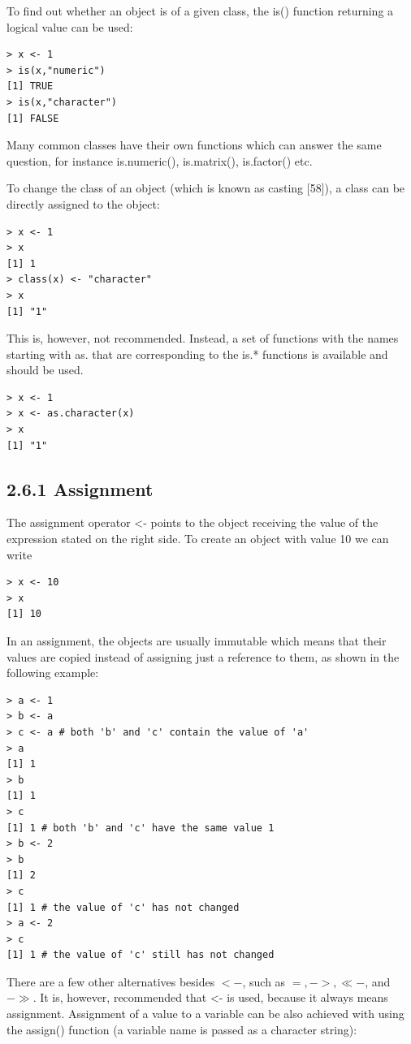 \documentclass[10pt]{book}
\begin{document}
To find out whether an object is of a given class, the is() function returning a logical value can be used:

\begin{verbatim}
> x <- 1
> is(x,"numeric")
[1] TRUE
> is(x,"character")
[1] FALSE
\end{verbatim}

Many common classes have their own functions which can answer the same question, for instance is.numeric(), is.matrix(), is.factor() etc.

To change the class of an object (which is known as casting [58]), a class can be directly assigned to the object:

\begin{verbatim}
> x <- 1
> x
[1] 1
> class(x) <- "character"
> x
[1] "1"
\end{verbatim}

This is, however, not recommended. Instead, a set of functions with the names starting with as. that are corresponding to the is.* functions is available and should be used.

\begin{verbatim}
> x <- 1
> x <- as.character(x)
> x
[1] "1"
\end{verbatim}

\subsection*{2.6.1 Assignment}
The assignment operator <- points to the object receiving the value of the expression stated on the right side. To create an object with value 10 we can write

\begin{verbatim}
> x <- 10
> x
[1] 10
\end{verbatim}

In an assignment, the objects are usually immutable which means that their values are copied instead of assigning just a reference to them, as shown in the following example:

\begin{verbatim}
> a <- 1
> b <- a
> c <- a # both 'b' and 'c' contain the value of 'a'
> a
[1] 1
> b
[1] 1
> c
[1] 1 # both 'b' and 'c' have the same value 1
> b <- 2
> b
[1] 2
> c
[1] 1 # the value of 'c' has not changed
> a <- 2
> c
[1] 1 # the value of 'c' still has not changed
\end{verbatim}

There are a few other alternatives besides $<-$, such as $=,->, \ll-$, and $-\gg$. It is, however, recommended that <- is used, because it always means assignment. Assignment of a value to a variable can be also achieved with using the assign() function (a variable name is passed as a character string):
\end{document}
